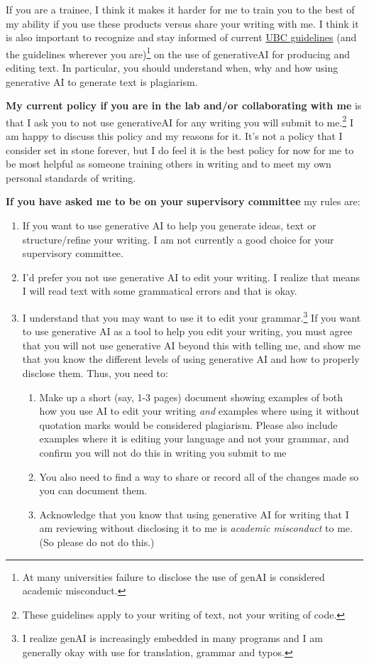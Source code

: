 \documentclass[11pt]{article}
\begin{document}
If you are a trainee, I think it makes it harder for me to train you to the best of my ability if you use these products versus share your writing with me. I think it is also important to recognize and stay informed of current \href{http://grad.ubc.ca/current-students/student-responsibilities/use-generative-ai}{UBC guidelines} (and the guidelines wherever you are)\footnote{At many universities failure to disclose the use of genAI is considered academic misconduct.}
 on the use of generativeAI for producing and editing text. In particular, you should understand when, why and how using generative AI to generate text is plagiarism.
 
{\bf My current policy if you are in the lab and/or collaborating with me} is that I ask you to not use generativeAI for any writing you will submit to me.\footnote{These guidelines apply to your writing of text, not your writing of code.} I am happy to discuss this policy and my reasons for it. It's not a policy that I consider set in stone forever, but I do feel it is the best policy for now for me to be most helpful as someone training others in writing and to meet my own personal standards of writing. 

\newpage
{\bf If you have asked me to be on your supervisory committee} my rules are:
\begin{enumerate}
\item If you want to use generative AI to help you generate ideas, text or structure/refine your writing. I am not currently a good choice for your supervisory committee. 
\item I’d prefer you not use generative AI to edit your writing. I realize that means I will read text with some grammatical errors and that is okay. 
\item I understand that you may want to use it to edit your grammar.\footnote{I realize genAI is increasingly embedded in many programs and I am generally okay with use for translation, grammar and typos.}  If you want to use generative AI as a tool to help you edit your writing, you must agree that you will not use generative AI beyond this with telling me, and show me that you know the different levels of using generative AI and how to properly disclose them. Thus, you need to:
\begin{enumerate}
\item Make up a short (say, 1-3 pages) document showing examples of both how you use AI to edit your writing \emph{and} examples where using it without quotation marks would be considered plagiarism. Please also include examples where it is editing your language and not your grammar, and confirm you will not do this in writing you submit to me
\item You also need to find a way to share or record all of the changes made so you can document them.
\item Acknowledge that you know that using generative AI for writing that I am reviewing without disclosing it to me is \emph{academic misconduct} to me. (So please do not do this.)
\end{enumerate}
\end{enumerate}
\end{document}
